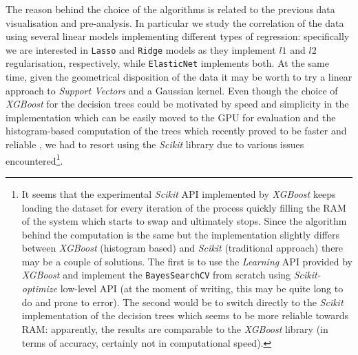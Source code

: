    The reason behind the choice of the algorithms is related to the previous data visualisation and pre-analysis. In particular we study the correlation of the data using several linear models implementing different types of regression: specifically we are interested in \texttt{Lasso} and \texttt{Ridge} models as they implement $l1$ and $l2$ regularisation, respectively, while \texttt{ElasticNet} implements both. At the same time, given the geometrical disposition of the data it may be worth to try a linear approach to \textit{Support Vectors} and a Gaussian kernel. Even though the choice of \textit{XGBoost} for the decision trees could be motivated by speed and simplicity in the implementation which can be easily moved to the GPU for evaluation and the histogram-based computation of the trees which recently proved to be faster and reliable \cite{ke2017lightgbm}, we had to resort using the \textit{Scikit} library due to various issues encountered\footnote{It seems that the experimental \textit{Scikit} API implemented by \textit{XGBoost} keeps loading the dataset for every iteration of the process quickly filling the RAM of the system which starts to swap and ultimately stops. Since the algorithm behind the computation is the same but the implementation slightly differs between \textit{XGBoost} (histogram based) and \textit{Scikit} (traditional approach) there may be a couple of solutions. The first is to use the \textit{Learning} API provided by \textit{XGBoost} and implement the \texttt{BayesSearchCV} from scratch using \textit{Scikit-optimize} low-level API (at the moment of writing, this may be quite long to do and prone to error). The second would be to switch directly to the \textit{Scikit} implementation of the decision trees which seems to be more reliable towards RAM: apparently, the results are comparable to the \textit{XGBoost} library (in terms of accuracy, certainly not in computational speed).}.

